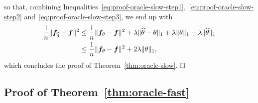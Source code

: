 so that, combining Inequalities~\eqref{eq:proof-oracle-slow-step1},~\eqref{eq:proof-oracle-slow-step2} and~\eqref{eq:proof-oracle-slow-step3}, we end up with
\begin{align*}
	\frac 1n \| {\boldsymbol f}_{\widehat \theta} - {\boldsymbol f} \|^2 &
	\leq \frac 1n \| {\boldsymbol f}_\theta - {\boldsymbol f} \|^2 
	+ \lambda \| \widehat \theta - \theta \|_1 
	+ \lambda \| \theta \|_1 
	- \lambda \| \widehat \theta \|_1 \\
	&\leq \frac 1n \| {\boldsymbol f}_\theta - {\boldsymbol f} \|^2 + 2 \lambda \| \theta \|_1,
\end{align*}
which concludes the proof of Theorem~\ref{thm:oracle-slow}. $\hfill \square$


\subsection{Proof of Theorem~\ref{thm:oracle-fast}} %
\label{sub:proof_of_theorem_thm:oracle-fast}


